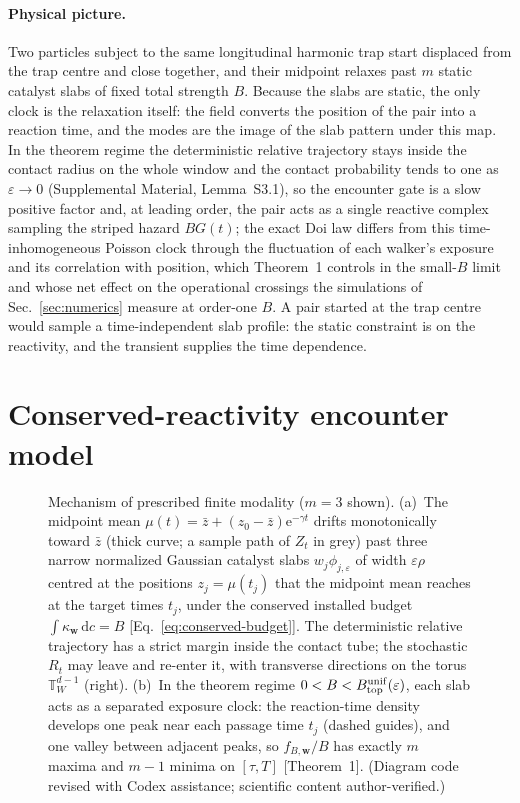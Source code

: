 \documentclass[aps,physrev,reprint,amsmath,amssymb,longbibliography,floatfix]{revtex4-2}
\newcommand{\dd}{\mathrm d}
\newcommand{\e}{\mathrm e}
\begin{document}
\paragraph{Physical picture.}
Two particles subject to the same longitudinal harmonic trap start displaced
from the trap centre and close together, and their midpoint relaxes past \(m\)
static catalyst slabs of fixed total strength \(B\).  Because the slabs are
static, the only clock is the relaxation itself: the field converts the
position of the pair into a reaction time, and the modes are the image of the
slab pattern under this map.  In the theorem regime the deterministic
relative trajectory stays inside the contact radius on the whole window and
the contact probability tends to one as \(\varepsilon\to0\) (Supplemental
Material, Lemma~S3.1), so the encounter gate is a slow positive factor and,
at leading order, the pair acts as a single reactive complex sampling the
striped hazard \(BG(t)\); the exact Doi law differs from this
time-inhomogeneous Poisson clock through the fluctuation of each walker's
exposure and its correlation with position, which Theorem~1 controls in the
small-\(B\) limit and whose net effect on the operational crossings the
simulations of Sec.~\ref{sec:numerics} measure at order-one \(B\).  A pair started at the trap centre would sample a
time-independent slab profile: the static constraint is on the reactivity,
and the transient supplies the time dependence.

\section{Conserved-reactivity encounter model}
\label{sec:model}

\begin{figure}[t]
  \resizebox{\columnwidth}{!}{}
  \caption{Mechanism of prescribed finite modality ($m=3$ shown).
    (a)~The midpoint mean $\mu(t)=\bar z+(z_0-\bar z)\e^{-\gamma t}$
    drifts monotonically toward $\bar z$ (thick curve; a sample path of
    $Z_t$ in grey) past three narrow normalized Gaussian catalyst slabs
    $w_j\phi_{j,\varepsilon}$ of width $\varepsilon\rho$ centred at the
    positions $z_j=\mu(t_j)$ that the midpoint mean reaches at the target
    times $t_j$, under the conserved installed budget
    $\int\kappa_{\bm w}\,\dd c=B$ [Eq.~\eqref{eq:conserved-budget}].
    The deterministic relative trajectory has a strict margin inside the
    contact tube; the stochastic $R_t$ may leave and re-enter it, with
    transverse directions on the torus $\mathbb T_W^{d-1}$ (right).
    (b)~In the theorem regime
    $0<B<B_{\rm top}^{\rm unif}(\varepsilon)$, each slab acts as a
    separated exposure clock: the reaction-time density develops one
    peak near each passage time $t_j$ (dashed
    guides), and one valley between adjacent peaks, so
    $f_{B,\bm w}/B$ has exactly $m$ maxima and $m-1$ minima on
    $[\tau,T]$ [Theorem~1].  (Diagram code revised with Codex assistance;
    scientific content author-verified.)}
  \label{fig:mechanism}
\end{figure}
\end{document}
